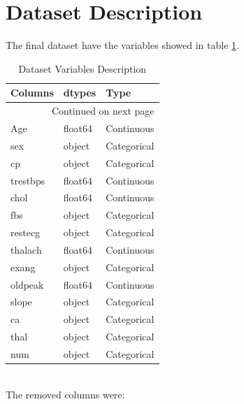 \documentclass{article}
\begin{document}
\section{Dataset Description}

The final dataset have the variables showed in table \ref{tab:desc}.\\
\begin{longtable}{lll}
\caption{Dataset Variables Description}\label{tab:desc}\\
\toprule
  Columns &   dtypes &         Type \\
\midrule
\endhead
\midrule
\multicolumn{3}{r}{{Continued on next page}} \\
\midrule
\endfoot

\bottomrule
\endlastfoot
      Age &  float64 &   Continuous \\
      sex &   object &  Categorical \\
       cp &   object &  Categorical \\
 trestbps &  float64 &   Continuous \\
     chol &  float64 &   Continuous \\
      fbs &   object &  Categorical \\
  restecg &   object &  Categorical \\
  thalach &  float64 &   Continuous \\
    exang &   object &  Categorical \\
  oldpeak &  float64 &   Continuous \\
    slope &   object &  Categorical \\
       ca &   object &  Categorical \\
     thal &   object &  Categorical \\
      num &   object &  Categorical \\
\end{longtable}

\\

The removed columns were:\\
\begin{itemize}
 
  \end{itemize}
\end{document}
